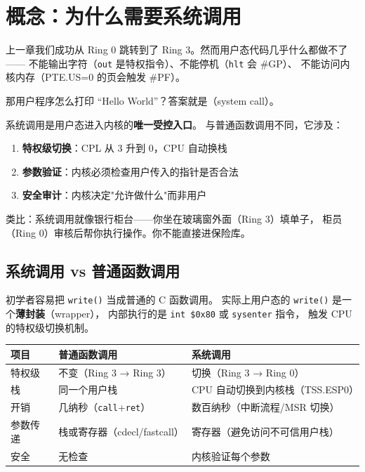 \section{概念：为什么需要系统调用}
\label{sec:syscall-concept}

上一章我们成功从 Ring 0 跳转到了 Ring 3。然而用户态代码几乎什么都做不了——
不能输出字符（\texttt{out} 是特权指令）、不能停机（\texttt{hlt} 会 \#GP）、
不能访问内核内存（PTE.US=0 的页会触发 \#PF）。

那用户程序怎么打印 ``Hello World''？答案就是（system call）。

\begin{whybox}
系统调用是用户态进入内核的\textbf{唯一受控入口}。
与普通函数调用不同，它涉及：
\begin{enumerate}
  \item \textbf{特权级切换}：CPL 从 3 升到 0，CPU 自动换栈
  \item \textbf{参数验证}：内核必须检查用户传入的指针是否合法
  \item \textbf{安全审计}：内核决定"允许做什么"而非用户
\end{enumerate}
类比：系统调用就像银行柜台——你坐在玻璃窗外面（Ring 3）填单子，
柜员（Ring 0）审核后帮你执行操作。你不能直接进保险库。
\end{whybox}

\subsection{系统调用 vs 普通函数调用}

初学者容易把 \texttt{write()} 当成普通的 C 函数调用。
实际上用户态的 \texttt{write()} 是一个\textbf{薄封装}（wrapper），
内部执行的是 \texttt{int \$0x80} 或 \texttt{sysenter} 指令，
触发 CPU 的特权级切换机制。

\begin{center}
\begin{tabular}{lll}
  \toprule
  \textbf{项目} & \textbf{普通函数调用} & \textbf{系统调用} \\
  \midrule
  特权级   & 不变（Ring 3 → Ring 3）  & 切换（Ring 3 → Ring 0） \\
  栈       & 同一个用户栈             & CPU 自动切换到内核栈（TSS.ESP0） \\
  开销     & 几纳秒（\texttt{call}+\texttt{ret}） & 数百纳秒（中断流程/MSR 切换） \\
  参数传递 & 栈或寄存器（cdecl/fastcall） & 寄存器（避免访问不可信用户栈） \\
  安全     & 无检查                   & 内核验证每个参数 \\
  \bottomrule
\end{tabular}
\end{center}

